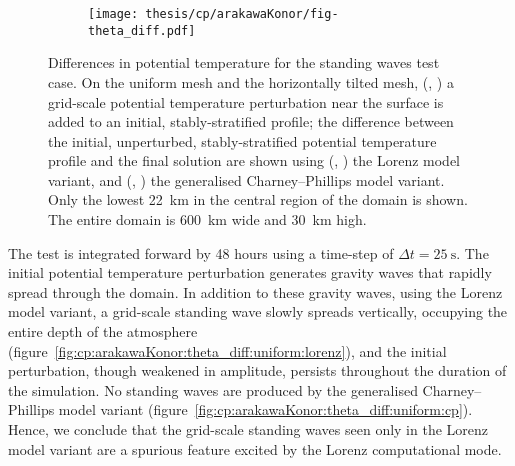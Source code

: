 \begin{figure}
	\centering
	\begin{subfigure}{\textwidth}
		\label{fig:cp:arakawaKonor:theta_diff:uniform:initial}
		\label{fig:cp:arakawaKonor:theta_diff:uniform:lorenz}
		\label{fig:cp:arakawaKonor:theta_diff:uniform:cp}
		\label{fig:cp:arakawaKonor:theta_diff:hEdgeGrading:initial}
		\label{fig:cp:arakawaKonor:theta_diff:hEdgeGrading:lorenz}
		\label{fig:cp:arakawaKonor:theta_diff:hEdgeGrading:cp}
		\texttt{[image: thesis/cp/arakawaKonor/fig-theta\_diff.pdf]}
	\end{subfigure}
%
	\caption{Differences in potential temperature for the standing waves test case.
	On the uniform mesh and the horizontally tilted mesh,
	(,
	)
	a grid-scale potential temperature perturbation near the surface is added to an initial, stably-stratified profile;
the difference between the initial, unperturbed, stably-stratified potential temperature profile and the final solution are shown using
	(,
	)
	the Lorenz model variant, and 
	(,
	)
	the generalised Charney--Phillips model variant.
Only the lowest \SI{22}{\kilo\meter} in the central region of the domain is shown.  The entire domain is \SI{600}{\kilo\meter} wide and \SI{30}{\kilo\meter} high.
	}
	\label{fig:cp:arakawaKonor:theta_diff}
\end{figure}

The test is integrated forward by 48 hours using a time-step of $\Delta t = \SI{25}{\second}$.
The initial potential temperature perturbation generates gravity waves that rapidly spread through the domain.
In addition to these gravity waves, using the Lorenz model variant, a grid-scale standing wave slowly spreads vertically, occupying the entire depth of the atmosphere (figure~\ref{fig:cp:arakawaKonor:theta_diff:uniform:lorenz}), and the initial perturbation, though weakened in amplitude, persists throughout the duration of the simulation.
No standing waves are produced by the generalised Charney--Phillips model variant (figure~\ref{fig:cp:arakawaKonor:theta_diff:uniform:cp}).
Hence, we conclude that the grid-scale standing waves seen only in the Lorenz model variant are a spurious feature excited by the Lorenz computational mode.

